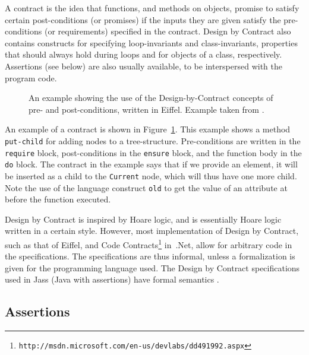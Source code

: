 \documentclass[a4paper,11pt]{kth-mag}
\theoremstyle{definition}
\begin{document}
A contract is the idea that functions, and methods on objects, promise to
satisfy certain post-conditions (or promises) if the inputs they are given
satisfy the pre-conditions (or requirements) specified in the contract. Design
by Contract also contains constructs for specifying loop-invariants and
class-invariants, properties that should always hold during loops and for
objects of a class, respectively. Assertions (see below) are also usually
available, to be interspersed with the program code.

\begin{figure}[h!]
	\begin{center}
	\begin{minipage}{0.7\textwidth}
    \lstset{language=Eiffel}
		
	\end{minipage}
	\end{center}
  \caption{An example showing the use of the Design-by-Contract concepts of
    pre- and post-conditions, written in Eiffel. Example taken from
    \cite{meyer92applyingdbc}.}
	\label{figure-dbc-example}
\end{figure}

An example of a contract is shown in Figure~\ref{figure-dbc-example}. This
example shows a method \texttt{put-child} for adding nodes to a tree-structure.
Pre-conditions are written in the \texttt{require} block, post-conditions in
the \texttt{ensure} block, and the function body in the \texttt{do} block. The
contract in the example says that if we provide an element, it will be inserted
as a child to the \texttt{Current} node, which will thus have one more child.
Note the use of the language construct \texttt{old} to get the value of an
attribute at before the function executed.

Design by Contract is inspired by Hoare logic, and is essentially Hoare logic
written in a certain style. However, most implementation of Design by Contract,
such as that of Eiffel, and Code
Contracts\footnote{\texttt{http://msdn.microsoft.com/en-us/devlabs/dd491992.aspx}}
in~.Net, allow for arbitrary code in the specifications. The specifications are
thus informal, unless a formalization is given for the programming language
used. The Design by Contract specifications used in Jass (Java with assertions)
have formal semantics \cite{bartetzko01jass}.


\subsection{Assertions}
\end{document}
